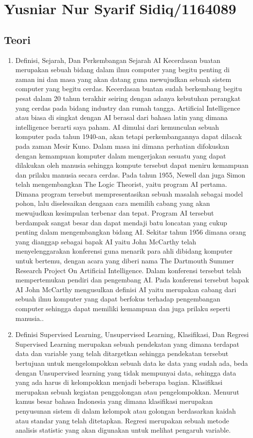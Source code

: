 \section{Yusniar Nur Syarif Sidiq/1164089}
\subsection{Teori}
\begin{enumerate}
\item
Definisi, Sejarah, Dan Perkembangan Sejarah AI
\subitem
Kecerdasan buatan merupakan sebuah bidang dalam ilmu computer yang begitu penting di zaman ini dan masa yang akan datang guna mewujudkan sebuah sistem computer yang begitu cerdas. Kecerdasan buatan sudah berkembang begitu pesat dalam 20 tahun terakhir seiring dengan adanya kebutuhan perangkat yang cerdas pada bidang industry dan rumah tangga.
\subitem
Artificial Intelligence atau biasa di singkat dengan AI berasal dari bahasa latin yang dimana intelligence berarti saya paham. AI dimulai dari kemunculan sebuah komputer pada tahun 1940-an, akan tetapi perkembangannya dapat dilacak pada zaman Mesir Kuno. Dalam masa ini dimana perhatian difokuskan dengan kemampuan komputer dalam mengerjakan sesuatu yang dapat dilakukan oleh manusia sehingga kompute tersebut dapat meniru kemampuan dan prilaku manusia secara cerdas.
\subitem
Pada tahun 1955, Newell dan juga Simon telah mengembangkan The Logic Theorist, yaitu program AI pertama. Dimana program tersebut mempresentasikan sebuah masalah sebagai model pohon, lalu diselesaikan dengaan cara memilih cabang yang akan mewujudkan kesimpulan terbenar dan tepat. Program AI tersebut berdampak sangat besar dan dapat mendaji batu loncatan yang cukup penting dalam mengembangkan bidang AI. Sekitar tahun 1956 dimana orang yang dianggap sebagai bapak AI yaitu John McCarthy telah menyelenggarakan konferensi guna menarik para ahli dibidang komputer untuk bertemu, dengan acara yang diberi nama The Dartmouth Summer Research Project On Artificial Intelligence. Dalam konferensi tersebut telah mempertemukan pendiri dan pengembang AI. Pada konferensi tersebut bapak AI John McCarthy mengusulkan definisi AI yaitu merupakan cabang dari sebuah ilmu komputer yang dapat berfokus terhadap pengembangan computer sehingga dapat memiliki kemampuan dan juga prilaku seperti manusia.\cite{baraja2008kecerdasan}.

\item
Definisi Supervised Learning, Unsupervised Learning, Klasifikasi, Dan Regresi
\subitem
Supervised Learning merupakan sebuah pendekatan yang dimana terdapat data dan variable yang telah ditargetkan sehingga pendekatan tersebut bertujuan untuk mengelompokkan sebuah data ke data yang sudah ada, beda dengan Unsupervised learning yang tidak mempunyai data, sehingga data yang ada harus di kelompokkan menjadi beberapa bagian.
\subitem
Klasifikasi merupakan sebuah kegiatan penggolongan atau pengelompokkan. Menurut kamus besar bahasa Indonesia yang dimana klasifikasi merupakan penyusunan sistem di dalam kelompok atau golongan berdasarkan kaidah atau standar yang telah ditetapkan. Regresi merupakan sebuah metode analisis statistic yang akan digunakan untuk melihat pengaruh variable.


\end{enumerate}
